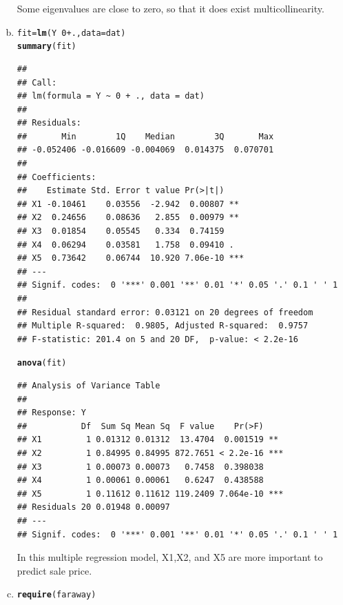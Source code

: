 \documentclass{article}\usepackage[]{graphicx}\usepackage[]{color}
\makeatletter
\newcommand{\hlnum}[1]{\textcolor[rgb]{0.686,0.059,0.569}{#1}}%
\newcommand{\hlopt}[1]{\textcolor[rgb]{0,0,0}{#1}}%
\newcommand{\hlstd}[1]{\textcolor[rgb]{0.345,0.345,0.345}{#1}}%
\newcommand{\hlkwb}[1]{\textcolor[rgb]{0.69,0.353,0.396}{#1}}%
\newcommand{\hlkwc}[1]{\textcolor[rgb]{0.333,0.667,0.333}{#1}}%
\newcommand{\hlkwd}[1]{\textcolor[rgb]{0.737,0.353,0.396}{\textbf{#1}}}%
\newenvironment{kframe}{%
 \def\at@end@of@kframe{}%
 \ifinner\ifhmode%
  \def\at@end@of@kframe{\end{minipage}}%
  \begin{minipage}{\columnwidth}%
 \fi\fi%
 \def\FrameCommand##1{\hskip\@totalleftmargin \hskip-\fboxsep
 \colorbox{shadecolor}{##1}\hskip-\fboxsep
     \hskip-\linewidth \hskip-\@totalleftmargin \hskip\columnwidth}%
 \MakeFramed {\advance\hsize-\width
   \@totalleftmargin\z@ \linewidth\hsize
   \@setminipage}}%
 {\par\unskip\endMakeFramed%
 \at@end@of@kframe}
\newenvironment{knitrout}{}{} %
\makeatother
\begin{document}
\begin{enumerate}[(a)]
\qquad Some eigenvalues are close to zero, so that it does exist multicollinearity.

\item

\begin{knitrout}
\color{fgcolor}\begin{kframe}
\begin{alltt}
  \hlstd{fit} \hlkwb{=} \hlkwd{lm}\hlstd{(Y} \hlopt{~} \hlnum{0} \hlopt{+} \hlstd{.,} \hlkwc{data} \hlstd{= dat)}
  \hlkwd{summary}\hlstd{(fit)}
\end{alltt}
\begin{verbatim}
## 
## Call:
## lm(formula = Y ~ 0 + ., data = dat)
## 
## Residuals:
##       Min        1Q    Median        3Q       Max 
## -0.052406 -0.016609 -0.004069  0.014375  0.070701 
## 
## Coefficients:
##    Estimate Std. Error t value Pr(>|t|)    
## X1 -0.10461    0.03556  -2.942  0.00807 ** 
## X2  0.24656    0.08636   2.855  0.00979 ** 
## X3  0.01854    0.05545   0.334  0.74159    
## X4  0.06294    0.03581   1.758  0.09410 .  
## X5  0.73642    0.06744  10.920 7.06e-10 ***
## ---
## Signif. codes:  0 '***' 0.001 '**' 0.01 '*' 0.05 '.' 0.1 ' ' 1
## 
## Residual standard error: 0.03121 on 20 degrees of freedom
## Multiple R-squared:  0.9805,	Adjusted R-squared:  0.9757 
## F-statistic: 201.4 on 5 and 20 DF,  p-value: < 2.2e-16
\end{verbatim}
\begin{alltt}
  \hlkwd{anova}\hlstd{(fit)}
\end{alltt}
\begin{verbatim}
## Analysis of Variance Table
## 
## Response: Y
##           Df  Sum Sq Mean Sq  F value    Pr(>F)    
## X1         1 0.01312 0.01312  13.4704  0.001519 ** 
## X2         1 0.84995 0.84995 872.7651 < 2.2e-16 ***
## X3         1 0.00073 0.00073   0.7458  0.398038    
## X4         1 0.00061 0.00061   0.6247  0.438588    
## X5         1 0.11612 0.11612 119.2409 7.064e-10 ***
## Residuals 20 0.01948 0.00097                       
## ---
## Signif. codes:  0 '***' 0.001 '**' 0.01 '*' 0.05 '.' 0.1 ' ' 1
\end{verbatim}
\end{kframe}
\end{knitrout}

\qquad In this multiple regression model, X1,X2, and X5 are more important to predict sale price.

\item
\begin{knitrout}
\color{fgcolor}\begin{kframe}
\begin{alltt}
  \hlkwd{require}\hlstd{(faraway)}
\end{alltt}



\end{kframe}
\end{knitrout}
\end{enumerate}
\end{document}
